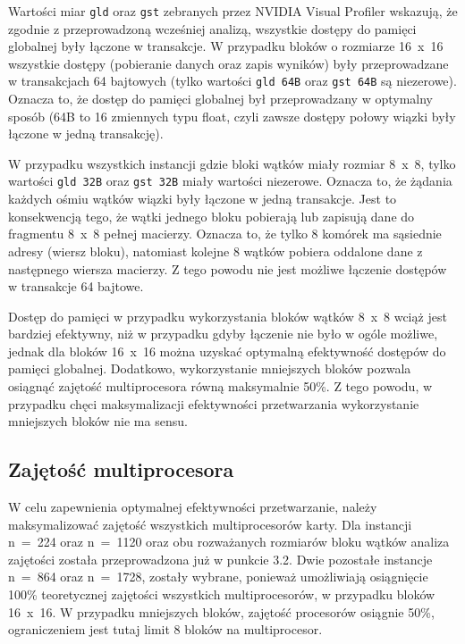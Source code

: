\documentclass[12pt,a4paper]{article}
\begin{document}
Wartości miar \verb|gld| oraz \verb|gst| zebranych przez NVIDIA Visual Profiler wskazują, że zgodnie z przeprowadzoną wcześniej analizą, wszystkie dostępy do pamięci globalnej były łączone w transakcje. W przypadku bloków o rozmiarze 16~x~16 wszystkie dostępy (pobieranie danych oraz zapis wyników) były przeprowadzane w transakcjach 64 bajtowych (tylko wartości \verb|gld 64B| oraz \verb|gst 64B| są niezerowe). Oznacza to, że dostęp do pamięci globalnej był przeprowadzany w optymalny sposób (64B to 16 zmiennych typu float, czyli zawsze dostępy połowy wiązki były łączone w jedną transakcję).

W przypadku wszystkich instancji gdzie bloki wątków miały rozmiar 8~x~8, tylko wartości \verb|gld 32B| oraz \verb|gst 32B| miały wartości niezerowe. Oznacza to, że żądania każdych ośmiu wątków wiązki były łączone w jedną transakcje. Jest to konsekwencją tego, że wątki jednego bloku pobierają lub zapisują dane do fragmentu 8~x~8 pełnej macierzy. Oznacza to, że tylko 8 komórek ma sąsiednie adresy (wiersz bloku), natomiast kolejne 8 wątków pobiera oddalone dane z następnego wiersza macierzy. Z tego powodu nie jest możliwe łączenie dostępów w transakcje 64 bajtowe.

Dostęp do pamięci w przypadku wykorzystania bloków wątków 8~x~8 wciąż jest bardziej efektywny, niż w przypadku gdyby łączenie nie było w ogóle możliwe, jednak dla bloków 16~x~16 można uzyskać optymalną efektywność dostępów do pamięci globalnej. Dodatkowo, wykorzystanie mniejszych bloków pozwala osiągnąć zajętość multiprocesora równą maksymalnie 50\%. Z tego powodu, w przypadku chęci maksymalizacji efektywności przetwarzania wykorzystanie mniejszych bloków nie ma sensu.

\subsection{Zajętość multiprocesora}

W celu zapewnienia optymalnej efektywności przetwarzanie, należy maksymalizować zajętość wszystkich multiprocesorów karty. Dla instancji n~=~224 oraz n~=~1120 oraz obu rozważanych rozmiarów bloku wątków analiza zajętości została przeprowadzona już w punkcie 3.2. Dwie pozostałe instancje n~=~864 oraz n~=~1728, zostały wybrane, ponieważ umożliwiają osiągnięcie  100\% teoretycznej zajętości wszystkich multiprocesorów, w przypadku bloków 16~x~16. W przypadku mniejszych bloków, zajętość procesorów osiągnie 50\%, ograniczeniem jest tutaj limit 8 bloków na multiprocesor.
\end{document}
